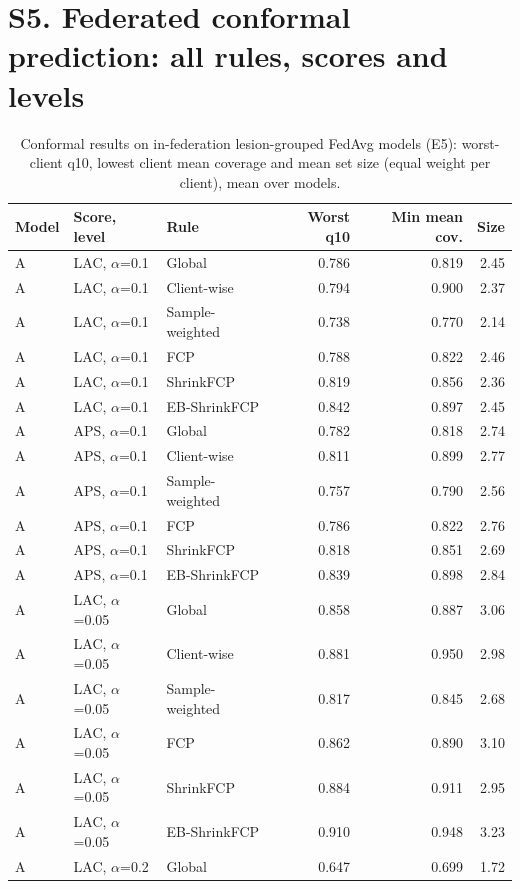 \documentclass[10pt]{article}
\begin{document}
\section*{S5. Federated conformal prediction: all rules, scores and levels}
\begin{table}[!htbp]
\centering
\scriptsize
\caption{Conformal results on in-federation lesion-grouped FedAvg models (E5): worst-client q10, lowest client mean coverage and mean set size (equal weight per client), mean over models.}
\label{tab:s5E5}
\begin{tabular}{@{}lllrrr@{}}
\toprule
Model & Score, level & Rule & Worst q10 & Min mean cov. & Size \\
\midrule
A & LAC, $\alpha$=0.1 & Global & 0.786 & 0.819 & 2.45 \\
A & LAC, $\alpha$=0.1 & Client-wise & 0.794 & 0.900 & 2.37 \\
A & LAC, $\alpha$=0.1 & Sample-weighted & 0.738 & 0.770 & 2.14 \\
A & LAC, $\alpha$=0.1 & FCP & 0.788 & 0.822 & 2.46 \\
A & LAC, $\alpha$=0.1 & ShrinkFCP & 0.819 & 0.856 & 2.36 \\
A & LAC, $\alpha$=0.1 & EB-ShrinkFCP & 0.842 & 0.897 & 2.45 \\
\midrule
A & APS, $\alpha$=0.1 & Global & 0.782 & 0.818 & 2.74 \\
A & APS, $\alpha$=0.1 & Client-wise & 0.811 & 0.899 & 2.77 \\
A & APS, $\alpha$=0.1 & Sample-weighted & 0.757 & 0.790 & 2.56 \\
A & APS, $\alpha$=0.1 & FCP & 0.786 & 0.822 & 2.76 \\
A & APS, $\alpha$=0.1 & ShrinkFCP & 0.818 & 0.851 & 2.69 \\
A & APS, $\alpha$=0.1 & EB-ShrinkFCP & 0.839 & 0.898 & 2.84 \\
\midrule
A & LAC, $\alpha$=0.05 & Global & 0.858 & 0.887 & 3.06 \\
A & LAC, $\alpha$=0.05 & Client-wise & 0.881 & 0.950 & 2.98 \\
A & LAC, $\alpha$=0.05 & Sample-weighted & 0.817 & 0.845 & 2.68 \\
A & LAC, $\alpha$=0.05 & FCP & 0.862 & 0.890 & 3.10 \\
A & LAC, $\alpha$=0.05 & ShrinkFCP & 0.884 & 0.911 & 2.95 \\
A & LAC, $\alpha$=0.05 & EB-ShrinkFCP & 0.910 & 0.948 & 3.23 \\
\midrule
A & LAC, $\alpha$=0.2 & Global & 0.647 & 0.699 & 1.72 \\

\end{tabular}
\end{table}
\end{document}
